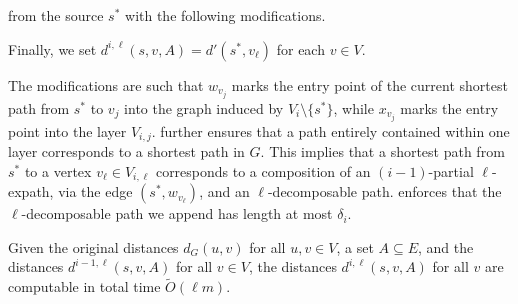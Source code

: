 \documentclass{article}\usepackage[a4paper,margin=20mm]{geometry}
\newcommand*{\Otilde}{\widetilde{O}}
\renewcommand{\leq}{\leqslant}
\begin{document}
from the source $s^*$ with the following modifications.
Finally, we set $d^{i,\ell}(s,v,A) = d'(s^*, v_{\ell})$ for each $v \in V$.

The modifications are such that $w_{v_j}$ marks the entry point of the current shortest path from $s^*$ to $v_j$ into the graph induced by $V_i{\setminus}\{s^*\}$, 
while $x_{v_j}$ marks the entry point into the layer $V_{i,j}$.
 further ensures that a path entirely contained within one layer
corresponds to a shortest path in $G$.
This implies that a shortest path from $s^*$ to a vertex $v_\ell \in V_{i,\ell}$
corresponds to a composition of an $(i{-}1)$-partial $\ell$-expath, via the edge $(s^*,w_{v_\ell})$,
and an $\ell$-decomposable path.
 enforces that the $\ell$-decomposable path we append
has length at most $\delta_i$.

\begin{lemma}
\label{lem:l-expath}
	Given the original distances $d_G(u,v)$ for all $u,v \in V$, 
	a set $A \subseteq E$, and the distances $d^{i-1,\ell}(s,v,A)$ for all $v \in V$,
	the distances $d^{i,\ell}(s, v, A)$ for all $v$ are computable in total time $\Otilde(\ell m)$.
\end{lemma}
\end{document}
